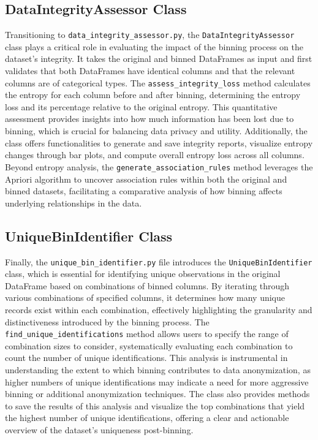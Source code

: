 \documentclass{article}
\begin{document}
\subsection*{DataIntegrityAssessor Class}
Transitioning to \texttt{data\_integrity\_assessor.py}, the \texttt{DataIntegrityAssessor} class plays a critical role in evaluating the impact of the binning process on the dataset's integrity. It takes the original and binned DataFrames as input and first validates that both DataFrames have identical columns and that the relevant columns are of categorical types. The \texttt{assess\_integrity\_loss} method calculates the entropy for each column before and after binning, determining the entropy loss and its percentage relative to the original entropy. This quantitative assessment provides insights into how much information has been lost due to binning, which is crucial for balancing data privacy and utility. Additionally, the class offers functionalities to generate and save integrity reports, visualize entropy changes through bar plots, and compute overall entropy loss across all columns. Beyond entropy analysis, the \texttt{generate\_association\_rules} method leverages the Apriori algorithm to uncover association rules within both the original and binned datasets, facilitating a comparative analysis of how binning affects underlying relationships in the data.

\subsection*{UniqueBinIdentifier Class}
Finally, the \texttt{unique\_bin\_identifier.py} file introduces the \texttt{UniqueBinIdentifier} class, which is essential for identifying unique observations in the original DataFrame based on combinations of binned columns. By iterating through various combinations of specified columns, it determines how many unique records exist within each combination, effectively highlighting the granularity and distinctiveness introduced by the binning process. The \texttt{find\_unique\_identifications} method allows users to specify the range of combination sizes to consider, systematically evaluating each combination to count the number of unique identifications. This analysis is instrumental in understanding the extent to which binning contributes to data anonymization, as higher numbers of unique identifications may indicate a need for more aggressive binning or additional anonymization techniques. The class also provides methods to save the results of this analysis and visualize the top combinations that yield the highest number of unique identifications, offering a clear and actionable overview of the dataset's uniqueness post-binning.
\end{document}
